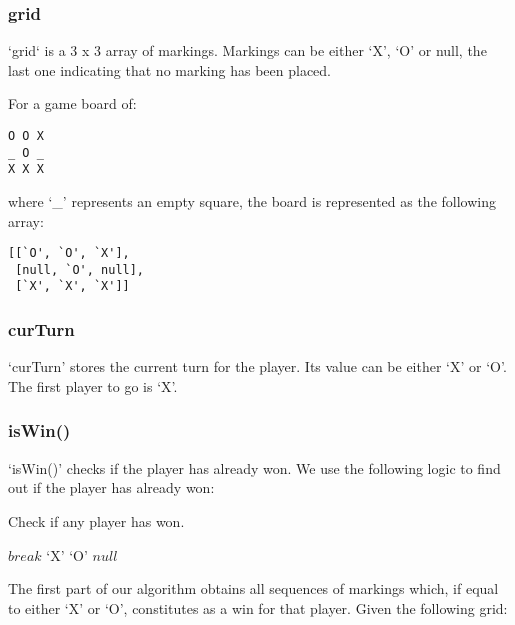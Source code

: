 \documentclass{article}
\newcommand{\qt}[1]{\mbox{`#1'}}
\begin{document}
\subsubsection{grid}

`grid` is a 3 x 3 array of markings. Markings can be either `X', `O' or null, the last one indicating that no marking has been placed.

For a game board of:

\begin{verbatim}
O O X
_ O _
X X X
\end{verbatim}

where `\_' represents an empty square, the board is represented as the following array:

\begin{verbatim}
[[`O', `O', `X'],
 [null, `O', null],
 [`X', `X', `X']]
\end{verbatim}

\subsubsection{curTurn}

`curTurn' stores the current turn for the player. Its value can be either `X' or `O'. The first player to go is `X'.

\subsubsection{isWin()}

`isWin()' checks if the player has already won. We use the following logic to find out if the player has already won:

\begin{algorithm}
\caption{Check if any player has won.}

\begin{algorithmic}[1]
        $break$
      \EndIf
    \EndFor
    \If{$seq[0] = \qt{X}$}
      \Return $\qt{X}$
    \ElsIf{$seq[0] = \qt{O}$}
      \Return $\qt{O}$
    \EndIf
  \EndFor
  \Return $null$
\EndProcedure
\end{algorithmic}
\end{algorithm}

The first part of our algorithm obtains all sequences of markings which, if equal to either `X' or `O', constitutes as a win for that player. Given the following grid:
\end{document}
